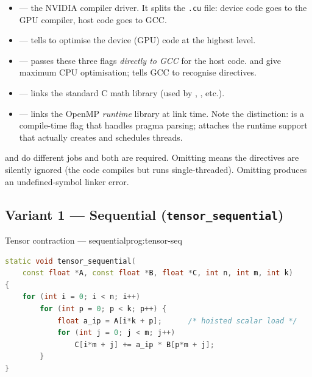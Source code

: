 \begin{itemize}
  \item {} --- the NVIDIA compiler driver. It splits the
    \texttt{.cu} file: device code goes to the GPU compiler, host code goes
    to GCC.
  \item {} --- tells  to optimise the device
    (GPU) code at the highest level.
  \item {} --- passes these
    three flags \emph{directly to GCC} for the host code. 
    and  give maximum CPU optimisation;
     tells GCC to recognise 
    directives.
  \item {} --- links the standard C math library (used by
    , , etc.).
  \item {} --- links the OpenMP \emph{runtime} library at
    link time. Note the distinction:  is a compile-time
    flag that handles pragma parsing;  attaches the runtime
    support that actually creates and schedules threads.
\end{itemize}
 
\begin{ppnote}
 and  do different jobs and both are
required. Omitting  means the 
directives are silently ignored (the code compiles but runs single-threaded).
Omitting  produces an undefined-symbol linker error.
\end{ppnote}


\subsection{Variant 1 --- Sequential (\texttt{tensor\_sequential})}
\label{ssec:code-seq}

\begin{ppprogram}{Tensor contraction --- sequential}{prog:tensor-seq}
\begin{lstlisting}[language=C++]
static void tensor_sequential(
    const float *A, const float *B, float *C, int n, int m, int k)
{
    for (int i = 0; i < n; i++)
        for (int p = 0; p < k; p++) {
            float a_ip = A[i*k + p];      /* hoisted scalar load */
            for (int j = 0; j < m; j++)
                C[i*m + j] += a_ip * B[p*m + j];
        }
}
\end{lstlisting}
\end{ppprogram}

